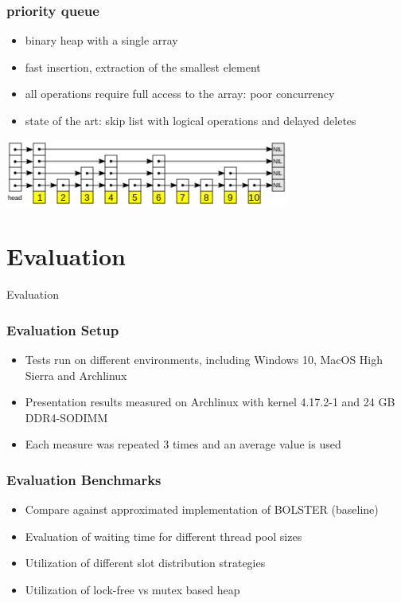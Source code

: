 \documentclass{beamer}
\begin{document}
\begin{frame}
	\frametitle{priority queue}
	\begin{itemize}
		\item binary heap with a single array
		\item fast insertion, extraction of the smallest element
		\item all operations require full access to the array: poor concurrency
		\item state of the art: skip list with logical operations and delayed deletes
	\end{itemize}
	\begin{center}
		\includegraphics[width=0.7\textwidth]{img/skip_list.png}
	\end{center}
\end{frame}

\section{Evaluation}
\begin{frame}
	\begin{center}
		\huge Evaluation
	\end{center}
\end{frame}

\begin{frame}
	\frametitle{Evaluation Setup}
	\begin{itemize}
		\item Tests run on different environments, including Windows 10, MacOS High Sierra and Archlinux
		\item Presentation results measured on Archlinux with kernel 4.17.2-1 and 24 GB DDR4-SODIMM
		\item Each measure was repeated 3 times and an average value is used
	\end{itemize}
\end{frame}

\begin{frame}
	\frametitle{Evaluation Benchmarks}
	\begin{itemize}
		\item Compare against approximated implementation of BOLSTER (baseline)
		\item Evaluation of waiting time for different thread pool sizes
		\item Utilization of different slot distribution strategies
		\item Utilization of lock-free vs mutex based heap
	\end{itemize}
\end{frame}
\end{document}
